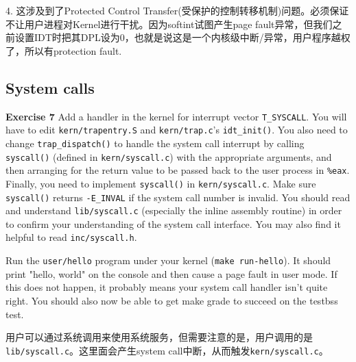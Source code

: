 \documentclass[11pt]{article}
\begin{document}
4. 这涉及到了Protected Control Transfer(受保护的控制转移机制)问题。必须保证不让用户进程对Kernel进行干扰。因为softint试图产生page fault异常，但我们之前设置IDT时把其DPL设为0，也就是说这是一个内核级中断/异常，用户程序越权了，所以有protection fault.

\subsection{System calls}
\begin{framed}
\noindent\textbf{Exercise 7} Add a handler in the kernel for interrupt vector \lstinline|T_SYSCALL|. You will have to edit \lstinline|kern/trapentry.S| and \lstinline|kern/trap.c|'s \lstinline|idt_init()|. You also need to change \lstinline|trap_dispatch()| to handle the system call interrupt by calling \lstinline|syscall()| (defined in \lstinline|kern/syscall.c|) with the appropriate arguments, and then arranging for the return value to be passed back to the user process in \lstinline|%eax|. Finally, you need to implement \lstinline|syscall()| in \lstinline|kern/syscall.c|. Make sure \lstinline|syscall()| returns \lstinline|-E_INVAL| if the system call number is invalid. You should read and understand \lstinline|lib/syscall.c| (especially the inline assembly routine) in order to confirm your understanding of the system call interface. You may also find it helpful to read \lstinline|inc/syscall.h|.

Run the \lstinline|user/hello| program under your kernel (\lstinline|make run-hello|). It should print "hello, world" on the console and then cause a page fault in user mode. If this does not happen, it probably means your system call handler isn't quite right. You should also now be able to get make grade to succeed on the testbss test.

\end{framed}
用户可以通过系统调用来使用系统服务，但需要注意的是，用户调用的是\lstinline|lib/syscall.c|。这里面会产生system call中断，从而触发\lstinline|kern/syscall.c|。
\end{document}
